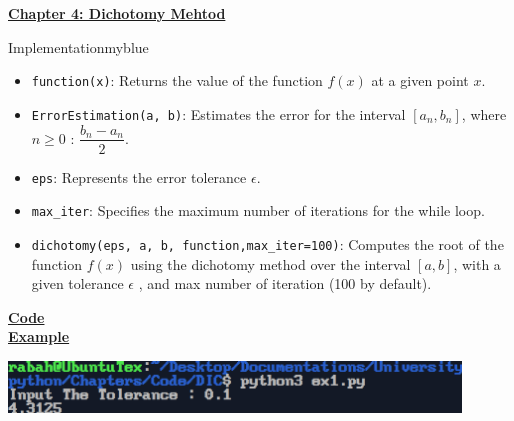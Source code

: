 \newpage
\begin{center}
    \Huge{\textbf{\underline{Chapter 4: Dichotomy Mehtod}}}
\end{center}

\vspace{0.77cm}
\setcounter{section}{0}

\begin{prettyBox}{Implementation}{myblue}
\begin{itemize}
    \item \texttt{function(x)}: Returns the value of the function \( f(x) \) at a given point \( x \).
    \item \texttt{ErrorEstimation(a, b)}: Estimates the error for the interval \([a_n, b_n]\), where \( n \geq 0 \) : \(\dfrac{b_n-a_n}{2}\).
    \item \texttt{eps}: Represents the error tolerance \( \epsilon \).
    \item \texttt{max\_iter}: Specifies the maximum number of iterations for the while loop.
    \item \texttt{dichotomy(eps, a, b, function,max\_iter=100)}: Computes the root of the function \( f(x) \) using the dichotomy method over the interval \([a, b]\), with a given tolerance \( \epsilon \) ,
        and max number of iteration (100 by default).
\end{itemize}
\end{prettyBox}

\vspace{1cm}
\textbf{\underline{Code}}\\[0.1cm]


\newpage
\textbf{\underline{Example}}\\[0.1cm]


\vspace{0.5cm}

\begin{center}
    \includegraphics[width = 0.9\textwidth]{Chapters/ScreenShot/DIC/dic.png}
\end{center}


